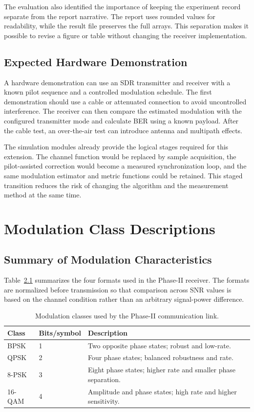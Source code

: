 \documentclass[12pt,twoside,openright]{report}
\begin{document}
The evaluation also identified the importance of keeping the experiment
record separate from the report narrative. The report uses rounded values
for readability, while the result file preserves the full arrays. This
separation makes it possible to revise a figure or table without changing
the receiver implementation.

\section{Expected Hardware Demonstration}
A hardware demonstration can use an SDR transmitter and receiver with a
known pilot sequence and a controlled modulation schedule. The first
demonstration should use a cable or attenuated connection to avoid
uncontrolled interference. The receiver can then compare the estimated
modulation with the configured transmitter mode and calculate BER using a
known payload. After the cable test, an over-the-air test can introduce
antenna and multipath effects.

The simulation modules already provide the logical stages required for this
extension. The channel function would be replaced by sample acquisition,
the pilot-assisted correction would become a measured synchronization loop,
and the same modulation estimator and metric functions could be retained.
This staged transition reduces the risk of changing the algorithm and the
measurement method at the same time.

\clearemptydoublepage
\appendix
\chapter{Modulation Class Descriptions}

\section{Summary of Modulation Characteristics}
Table~\ref{tab:appendixmodulation} summarizes the four formats used in the
Phase-II receiver. The formats are normalized before transmission so that
comparison across SNR values is based on the channel condition rather than
an arbitrary signal-power difference.

\begin{table}[htbp]
\centering
\small
\caption{Modulation classes used by the Phase-II communication link.}
\label{tab:appendixmodulation}
\begin{tabular}{p{} p{} p{}}
\toprule
\textbf{Class} & \textbf{Bits/symbol} & \textbf{Description}\\
\midrule
BPSK & 1 & Two opposite phase states; robust and low-rate.\\
QPSK & 2 & Four phase states; balanced robustness and rate.\\
8-PSK & 3 & Eight phase states; higher rate and smaller phase separation.\\
16-QAM & 4 & Amplitude and phase states; high rate and higher sensitivity.\\
\bottomrule
\end{tabular}
\end{table}
\end{document}

